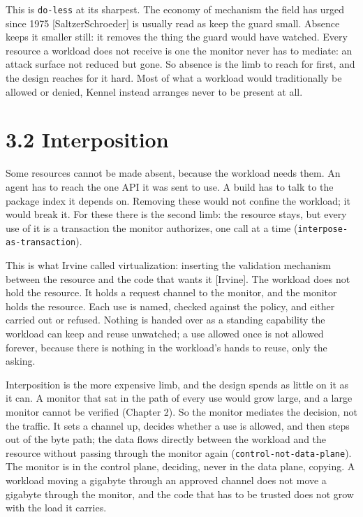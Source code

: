 This is \texttt{do-less} at its sharpest. The economy of mechanism the
field has urged since 1975 {[}SaltzerSchroeder{]} is usually read as
keep the guard small. Absence keeps it smaller still: it removes the
thing the guard would have watched. Every resource a workload does not
receive is one the monitor never has to mediate: an attack surface not
reduced but gone. So absence is the limb to reach for first, and the
design reaches for it hard. Most of what a workload would traditionally
be allowed or denied, Kennel instead arranges never to be present at
all.

\hypertarget{interposition}{%
\section{3.2 Interposition}\label{interposition}}

Some resources cannot be made absent, because the workload needs them.
An agent has to reach the one API it was sent to use. A build has to
talk to the package index it depends on. Removing these would not
confine the workload; it would break it. For these there is the second
limb: the resource stays, but every use of it is a transaction the
monitor authorizes, one call at a time
(\texttt{interpose-as-transaction}).

This is what Irvine called virtualization: inserting the validation
mechanism between the resource and the code that wants it {[}Irvine{]}.
The workload does not hold the resource. It holds a request channel to
the monitor, and the monitor holds the resource. Each use is named,
checked against the policy, and either carried out or refused. Nothing
is handed over as a standing capability the workload can keep and reuse
unwatched; a use allowed once is not allowed forever, because there is
nothing in the workload's hands to reuse, only the asking.

Interposition is the more expensive limb, and the design spends as
little on it as it can. A monitor that sat in the path of every use
would grow large, and a large monitor cannot be verified (Chapter 2). So
the monitor mediates the decision, not the traffic. It sets a channel
up, decides whether a use is allowed, and then steps out of the byte
path; the data flows directly between the workload and the resource
without passing through the monitor again
(\texttt{control-not-data-plane}). The monitor is in the control plane,
deciding, never in the data plane, copying. A workload moving a gigabyte
through an approved channel does not move a gigabyte through the
monitor, and the code that has to be trusted does not grow with the load
it carries.

